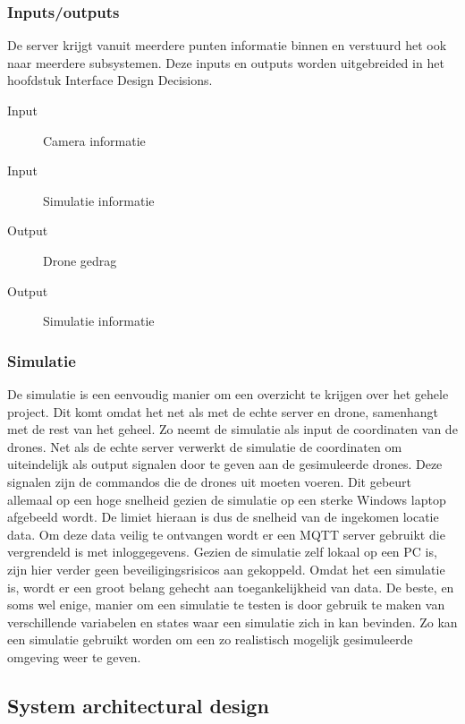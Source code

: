\subsubsection*{Inputs/outputs}
De server krijgt vanuit meerdere punten informatie binnen en verstuurd het ook naar meerdere subsystemen.
Deze inputs en outputs worden uitgebreided in het hoofdstuk Interface Design Decisions.


\begin{description}
    \item[Input] Camera informatie
    \item[Input] Simulatie informatie
    \item[Output] Drone gedrag
    \item[Output] Simulatie informatie
\end{description}


\newpage

\subsubsection{Simulatie}
De simulatie is een eenvoudig manier om een overzicht te krijgen over het gehele project. Dit komt omdat het net als met de echte server en drone, samenhangt met de rest van het geheel. Zo neemt de simulatie als input de coordinaten van de drones. Net als de echte server verwerkt de simulatie de coordinaten om uiteindelijk als output signalen door te geven aan de gesimuleerde drones. Deze signalen zijn de commandos die de drones uit moeten voeren. Dit gebeurt allemaal op een hoge snelheid gezien de simulatie op een sterke Windows laptop afgebeeld wordt. De limiet hieraan is dus de snelheid van de ingekomen locatie data. Om deze data veilig te ontvangen wordt er een MQTT server gebruikt die vergrendeld is met inloggegevens. Gezien de simulatie zelf lokaal op een PC is, zijn hier verder geen beveiligingsrisicos aan gekoppeld. Omdat het een simulatie is, wordt er een groot belang gehecht aan toegankelijkheid van data. De beste, en soms wel enige, manier om een simulatie te testen is door gebruik te maken van verschillende variabelen en states waar een simulatie zich in kan bevinden. Zo kan een simulatie gebruikt worden om een zo realistisch mogelijk gesimuleerde omgeving weer te geven.


\subsection{System architectural design}

